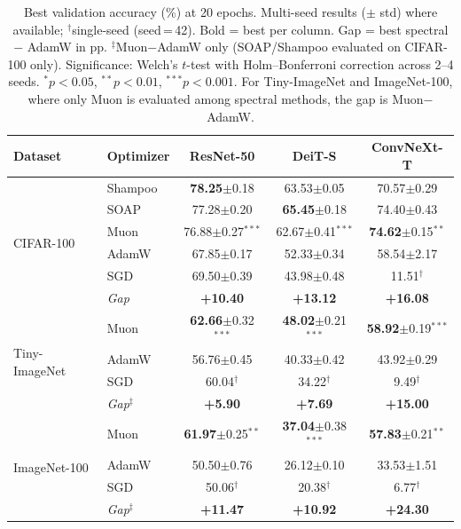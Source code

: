 \begin{table}[t]
\centering
\caption{Best validation accuracy (\%) at 20 epochs. Multi-seed results ($\pm$ std) where available; $^\dagger$single-seed (seed\,=\,42). Bold = best per column. Gap = best spectral $-$ AdamW in pp. $^\ddagger$Muon$-$AdamW only (SOAP/Shampoo evaluated on CIFAR-100 only). Significance: Welch's $t$-test with Holm--Bonferroni correction across 2--4 seeds. $^{*}p<0.05$, $^{**}p<0.01$, $^{***}p<0.001$. For Tiny-ImageNet and ImageNet-100, where only Muon is evaluated among spectral methods, the gap is Muon$-$AdamW.}
\label{tab:main_results}
\vspace{-0.5em}
\setlength{\tabcolsep}{4pt}
\small
\begin{tabular}{@{}llccc@{}}
\toprule
Dataset & Optimizer & ResNet-50 & DeiT-S & ConvNeXt-T \\
\midrule
\multirow{6}{*}{CIFAR-100}
  & Shampoo & \textbf{78.25}{\scriptsize$\pm$0.18} & 63.53{\scriptsize$\pm$0.05} & 70.57{\scriptsize$\pm$0.29} \\
  & SOAP  & 77.28{\scriptsize$\pm$0.20} & \textbf{65.45}{\scriptsize$\pm$0.18} & 74.40{\scriptsize$\pm$0.43} \\
  & Muon  & 76.88{\scriptsize$\pm$0.27}$^{***}$ & 62.67{\scriptsize$\pm$0.41}$^{***}$ & \textbf{74.62}{\scriptsize$\pm$0.15}$^{**}$ \\
  & AdamW & 67.85{\scriptsize$\pm$0.17} & 52.33{\scriptsize$\pm$0.34} & 58.54{\scriptsize$\pm$2.17} \\
  & SGD   & 69.50{\scriptsize$\pm$0.39} & 43.98{\scriptsize$\pm$0.48} & 11.51$^\dagger$ \\
\midrule
  & \textit{Gap} & \textbf{+10.40} & \textbf{+13.12} & \textbf{+16.08} \\
\midrule
\multirow{4}{*}{Tiny-ImageNet}
  & Muon  & \textbf{62.66}{\scriptsize$\pm$0.32}$^{***}$ & \textbf{48.02}{\scriptsize$\pm$0.21}$^{***}$ & \textbf{58.92}{\scriptsize$\pm$0.19}$^{***}$ \\
  & AdamW & 56.76{\scriptsize$\pm$0.45} & 40.33{\scriptsize$\pm$0.42} & 43.92{\scriptsize$\pm$0.29} \\
  & SGD   & 60.04$^\dagger$ & 34.22$^\dagger$ & 9.49$^\dagger$ \\
\midrule
  & \textit{Gap$^\ddagger$} & \textbf{+5.90} & \textbf{+7.69} & \textbf{+15.00} \\
\midrule
\multirow{4}{*}{ImageNet-100}
  & Muon  & \textbf{61.97}{\scriptsize$\pm$0.25}$^{**}$ & \textbf{37.04}{\scriptsize$\pm$0.38}$^{***}$ & \textbf{57.83}{\scriptsize$\pm$0.21}$^{**}$ \\
  & AdamW & 50.50{\scriptsize$\pm$0.76} & 26.12{\scriptsize$\pm$0.10} & 33.53{\scriptsize$\pm$1.51} \\
  & SGD   & 50.06$^\dagger$ & 20.38$^\dagger$ & 6.77$^\dagger$ \\
\midrule
  & \textit{Gap$^\ddagger$} & \textbf{+11.47} & \textbf{+10.92} & \textbf{+24.30} \\
\bottomrule
\end{tabular}
\vspace{-0.5em}
\end{table}


